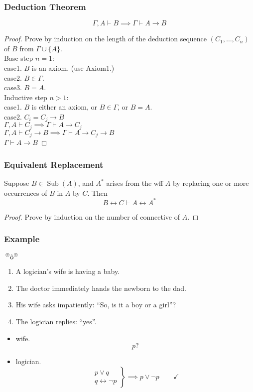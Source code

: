 \documentclass[UTF8,aspectratio=43,11pt,colorlinks,compress,openany]{beamer}%
\begin{document}
\begin{frame}\frametitle{Deduction Theorem}
	\begin{theorem}
		\[\Gamma, A\vdash B\implies\Gamma\vdash A\to B\]
	\end{theorem}
	\begin{proof}Prove by induction on the length of the deduction sequence $(C_1,\dots,C_n)$ of $B$ from $\Gamma\cup\{A\}$.\\
		Base step $n=1$:\\
		case1. $B$ is an axiom. (use Axiom1.)\\
		case2. $B\in\Gamma$.\\
		case3. $B=A$.\\
		Inductive step $n>1$:\\
		case1. $B$ is either an axiom, or $B\in\Gamma$, or $B=A$.\\
		case2. $C_i=C_j\to B$\\
		$\Gamma, A\vdash C_j\implies\Gamma\vdash A\to C_j$\\
		$\Gamma, A\vdash C_j\to B\implies\Gamma\vdash A\to C_j\to B$\\
		$\Gamma\vdash A\to B$
	\end{proof}
\end{frame}

\begin{frame}\frametitle{Equivalent Replacement}
	\begin{theorem}
		Suppose $B\in \operatorname{Sub}(A)$, and $A^*$ arises from the wff $A$ by replacing one or more occurrences of $B$ in $A$ by $C$. Then
		\[B\leftrightarrow C\vdash A\leftrightarrow A^*\]
	\end{theorem}
	\begin{proof}
		Prove by induction on the number of connective of $A$.
	\end{proof}
\end{frame}

\begin{frame}\frametitle{Example}
	\begin{block}{$\sideset{^\circledcirc}{^\circledcirc}{\operatorname{\hat{o}}}$}
		\begin{enumerate}
			\item A logician's wife is having a baby. 
			\item The doctor immediately hands the newborn to the dad.
			\item His wife asks impatiently: ``So, is it a boy or a girl''?
			\item The logician replies: ``yes''.
		\end{enumerate}
	\end{block}
	\begin{itemize}
	\item wife.
	\[p?\]
	\item logician.
	\[\left.\begin{array}{r} p\vee q\\q\leftrightarrow\neg p\end{array}\right\}\implies p\vee\neg p\qquad\checkmark\]
	\end{itemize}
\end{frame}
\end{document}
